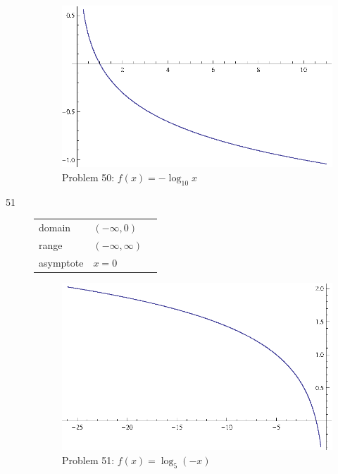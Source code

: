 \documentclass{exam}
\begin{document}
\begin{description}
      \begin{figure}[H]
        \centering
        \includegraphics[scale = 0.9]{problem50.eps}
        \caption{Problem 50: $f(x) = -\log_{10} x$}
      \end{figure}

    \item[51]
      \begin{tabular}[H]{lll}
        \toprule
        domain    & $(-\infty, 0)$ \\
        range     & $(-\infty, \infty)$ \\
        asymptote & $x = 0$ \\
        \bottomrule
      \end{tabular}

      \begin{figure}[H]
        \centering
        \includegraphics[scale = 0.9]{problem51.eps}
        \caption{Problem 51: $f(x) = \log_{5} (-x)$}
      \end{figure}


\end{description}
\end{document}

